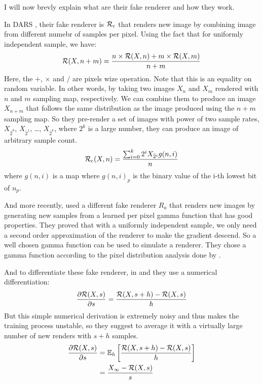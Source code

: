 \documentclass{classeENS}
\begin{document}
I will now brevly explain what are their fake renderer and how they work.

\par In DARS \cite{kuznetsov2018deep}, their fake renderer is $\mathcal R_{c}$ that renders 
new image by combining image from different numebr of samples per pixel. Using the fact that 
for uniformly independent sample, we have:
\[ \mathcal R(X,n+m) = \frac{n \times \mathcal R(X,n) + m \times \mathcal R(X,m)}{n+m} \]
Here, the $+$, $\times$ and $/$ are pixels wize operation. Note that this is an equality 
on random variable. In other words, by taking two images $X_n$ and $X_m$ rendered with 
$n$ and $m$ sampling map, respectively. We can combine them to produce an image 
$X_{n+m}$ that follows the same distribution as the image produced using the $n+m$ sampling map.
So they pre-render a set of images with power of two sample rates, $X_{\bar 2^0}$, $X_{\bar 2^1}$, \dots, $X_{\bar 2^k}$, 
where $2^k$ is a large number, they can produce an image of arbitrary sample count.
\begin{equation}
    \label{eq:3}
    \mathcal R_c(X,n) = \frac{\sum_{i=0}^k 2^i X_{\bar 2^i} g(n,i)}{n}
\end{equation}
where $g(n,i)$ is a map where $g(n,i)_p$ is the binary value of the i-th lowest bit of $n_p$.

\par And more recently, \cite{10.1145/3550454.3555515} used a different fake 
  renderer $R_{a}$ that renders new images by generating
  new samples from a learned per pixel gamma function that has good properties. They proved
  that with a uniformly independent sample, we only need a second order 
  approximation of the renderer to make the gradient descend. So a well 
  chosen gamma function can be used to simulate a renderer. They chose a 
  gamma function according to the pixel distribution analysis done by 
  \cite{elek2019learning}.

\par And to differentiate these fake renderer, in \cite{kuznetsov2018deep} and
\cite{10.1145/3550454.3555515} they use a numerical differentiation:
  \[ \frac{\partial \mathcal R(X,s)}{\partial s} = \frac{\mathcal R(X,s+h) - \mathcal R(X,s)}{h}\]
  But this simple numerical derivation is extremely noisy and thus makes the 
  training process unstable, so they suggest to average 
  it with a virtually large number of new renders with $s+h$ samples.
  \begin{align}
      \label{eq:4}
      \frac{\partial \mathcal R(X,s)}{\partial s} & = \mathbb E_h \left [\frac{\mathcal R(X,s+h) - \mathcal R(X,s)}{h} \right ] \\
      & = \frac{X_\infty - \mathcal R(X,s)}{s}
  \end{align}
\end{document}
